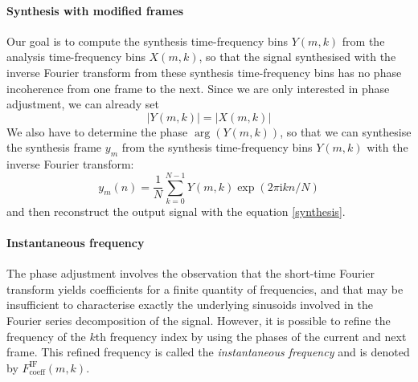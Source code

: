 \documentclass[letterpaper]{article}
\begin{document}
\paragraph{Synthesis with modified frames}
Our goal is to compute the synthesis time-frequency bins \(Y(m,k)\) from the
analysis time-frequency bins \(X(m,k)\), so that the signal synthesised with the
inverse Fourier transform from these synthesis time-frequency bins has no phase
incoherence from one frame to the next. Since we are only interested in phase
adjustment, we can already set
\begin{equation}
    |Y(m,k)| = |X(m,k)|
\end{equation}
We also have to determine the phase \(\arg(Y(m,k))\), so that we can synthesise
the synthesis frame \(y_m\) from the synthesis time-frequency bins \(Y(m,k)\)
with the inverse Fourier transform:
\begin{equation}
		y_m(n)=\frac{1}{N}\sum_{k=0}^{N-1}Y(m,k)\exp(2\pi\text{i}kn/N)
\end{equation}
and then reconstruct the output signal with the equation \eqref{synthesis}.

\paragraph{Instantaneous frequency}
The phase adjustment involves the observation that the short-time Fourier
transform yields coefficients for a finite quantity of frequencies, and that may
be insufficient to characterise exactly the underlying sinusoids involved in the
Fourier series decomposition of the signal. However, it is possible to refine
the frequency of the \(k\)th frequency index by using the phases of the current
and next frame. This refined frequency is called the \emph{instantaneous
frequency} and is denoted by \(F_{\text{coeff}}^{\text{IF}}(m,k)\).
\end{document}
